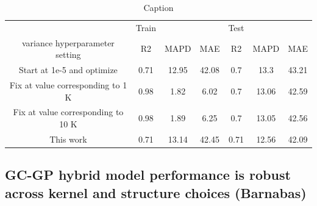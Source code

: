 \documentclass[journal=jacsat,manuscript=article]{achemso}
\begin{document}
\begin{table}[H]
    \centering
    \begin{tabular}{ccccccc}
         &  Train&  &  &  Test&  & 
\\
         variance hyperparameter setting&  R2 &  MAPD&  MAE&  R2 &  MAPD& MAE
\\
         Start at 1e-5 and optimize&  0.71&  12.95&  42.08&  0.7&  13.3& 43.21
\\
         Fix at value corresponding to 1 K &  0.98&  1.82&  6.02&  0.7&  13.06& 42.59
\\
         Fix at value corresponding to 10 K &  0.98&  1.89&  6.25&  0.7&  13.05& 42.56
\\
         This work&  0.71&  13.14&  42.45&  0.71&  12.56& 42.09
\\
    \end{tabular}
    \caption{Caption}
    \label{tab:my_label}
\end{table}


\subsection{GC-GP hybrid model performance is robust across kernel and structure choices (Barnabas) }
\end{document}
